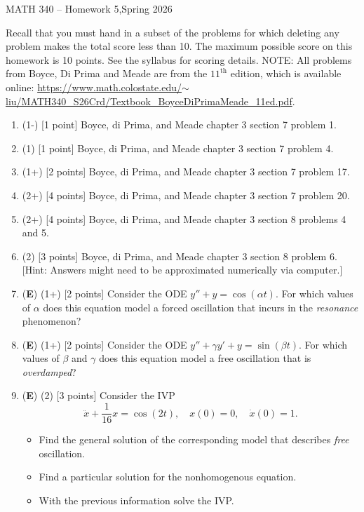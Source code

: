 \documentclass[12pt]{article}
\begin{document}
\begin{center}
    {\Large MATH 340 -- Homework 5,\quad Spring 2026}
\end{center}

Recall that you must hand in a subset of the problems for which deleting any problem makes the total score less than 10. The maximum possible score on this homework is 10 points. See the syllabus for scoring details. NOTE: All problems from Boyce, Di Prima and Meade are from the \(11^{\text{th}}\)  edition, which is available online: \href{https://www.math.colostate.edu/~liu/MATH340_S26Crd/Textbook_BoyceDiPrimaMeade_11ed.pdf}{https://www.math.colostate.edu/\(\sim\)liu/MATH340\_S26Crd/Textbook\_BoyceDiPrimaMeade\_11ed.pdf}.

\begin{enumerate}

  \item (1-) [1 point] Boyce, di Prima, and Meade chapter 3 section 7 problem 1.
  
  \item (1) [1 point] Boyce, di Prima, and Meade chapter 3 section 7 problem 4.
  
  \item (1+) [2 points] Boyce, di Prima, and Meade chapter 3 section 7 problem 17.
  
  \item (2+) [4 points] Boyce, di Prima, and Meade chapter 3 section 7 problem 20.
  
  \item (2+) [4 points] Boyce, di Prima, and Meade chapter 3 section 8 problems 4 and 5.
  
  \item (2) [3 points] Boyce, di Prima, and Meade chapter 3 section 8 problem 6. [Hint: Answers might need to be approximated numerically via computer.]
  
  \item (\textbf{E}) (1+) [2 points] Consider the ODE \(y''+y=\cos(\alpha t)\). For which values of \(\alpha\) does this equation model a forced oscillation that incurs in the \emph{resonance} phenomenon?
  
  \item (\textbf{E}) (1+) [2 points] Consider the ODE \(y''+\gamma y'+y=\sin(\beta t)\). For which values of \(\beta\) and \(\gamma\) does this equation model a free oscillation that is \emph{overdamped}?
  
  \item (\textbf{E}) (2) [3 points] Consider the IVP
  \[
  \ddot{x}+\frac{1}{16}x=\cos(2t),\quad x(0)=0,\quad \dot{x}(0)=1.
  \]
  \begin{itemize}
    \item Find the general solution of the corresponding model that describes \emph{free} oscillation.
    \item Find a particular solution for the nonhomogenous equation.
    \item With the previous information solve the IVP.
  \end{itemize}
  

\end{enumerate}
\end{document}
